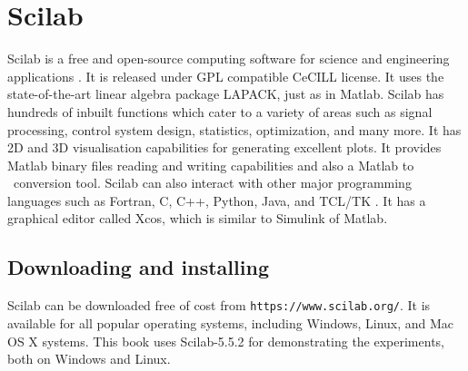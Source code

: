 
\section{Scilab}
\label{sec:sci-start}
Scilab is a free and open-source computing software for science and
engineering applications \cite{scilab-ref}. It is released under GPL
compatible CeCILL license.  It uses the state-of-the-art linear
algebra package LAPACK, just as in Matlab.  Scilab has hundreds of
inbuilt functions which cater to a variety of areas such as signal
processing, control system design, statistics, optimization, and many
more. It has 2D and 3D visualisation capabilities for generating
excellent plots. It provides Matlab binary files reading and writing
capabilities and also a Matlab to \scilab\ conversion tool. Scilab can
also interact with other major programming languages such as Fortran,
C, C++, Python, Java, and TCL/TK \cite{scilab-interop}.  It has a
graphical editor called Xcos, which is similar to Simulink of Matlab. 

\subsection{Downloading and installing \scilab}\label{scilab-installation}
Scilab can be downloaded free of cost from {\tt https://www.scilab.org/}. It is
available for all popular operating systems, including Windows, Linux,
and Mac OS X systems.  This book uses Scilab-5.5.2 for demonstrating
the experiments, both on Windows and Linux.

